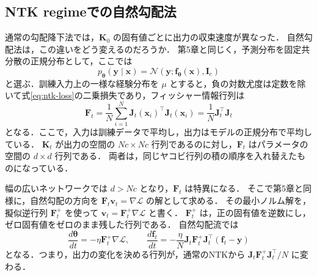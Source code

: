 \documentclass[../main.tex]{subfiles}
\begin{document}
\subsection{NTK regimeでの自然勾配法}

通常の勾配降下法では，$\bm{K}_0$ の固有値ごとに出力の収束速度が異なった．
自然勾配法は，この違いをどう変えるのだろうか．
第5章と同じく，予測分布を固定共分散の正規分布として，ここでは
\begin{equation}
  p_{\bm{\theta}}(\bm{y}\mid\bm{x})
  =\mathcal{N}(\bm{y};\bm{f}_{\bm{\theta}}(\bm{x}),\bm{I}_c)
  \label{eq:ntk-predictive-model}
\end{equation}
と選ぶ．訓練入力上の一様な経験分布を $\mu$ とすると，負の対数尤度は定数を除いて式\eqref{eq:ntk-loss}の二乗損失であり，フィッシャー情報行列は
\begin{equation}
  \bm{F}_t
  =\frac1N\sum_{i=1}^N\bm{J}_t(\bm{x}_i)^\top\bm{J}_t(\bm{x}_i)
  =\frac1N\bm{J}_t^\top\bm{J}_t
  \label{eq:ntk-fisher}
\end{equation}
となる．ここで，入力は訓練データで平均し，出力はモデルの正規分布で平均している．
$\bm{K}_t$ が出力の空間の $Nc\times Nc$ 行列であるのに対し，$\bm{F}_t$ はパラメータの空間の $d\times d$ 行列である．
両者は，同じヤコビ行列の積の順序を入れ替えたものになっている．

幅の広いネットワークでは $d>Nc$ となり，$\bm{F}_t$ は特異になる．
そこで第5章と同様に，自然勾配の方向を $\bm{F}_t\bm{v}_t=\nabla\mathcal{L}$ の解として求める．
その最小ノルム解を，擬似逆行列 $\bm{F}_t^+$ を使って $\bm{v}_t=\bm{F}_t^+\nabla\mathcal{L}$ と書く．
$\bm{F}_t^+$ は，正の固有値を逆数にし，ゼロ固有値をゼロのまま残した行列である．
自然勾配流では
\begin{equation}
  \frac{d\bm{\theta}}{dt}=-\eta\bm{F}_t^+\nabla\mathcal{L},
  \qquad
  \frac{d\bm{f}_t}{dt}
  =-\frac{\eta}{N}\bm{J}_t\bm{F}_t^+\bm{J}_t^\top
    (\bm{f}_t-\bm{y})
  \label{eq:ntk-natural-flow}
\end{equation}
となる．つまり，出力の変化を決める行列が，通常のNTKから
$\bm{J}_t\bm{F}_t^+\bm{J}_t^\top/N$ に変わる．
\end{document}
